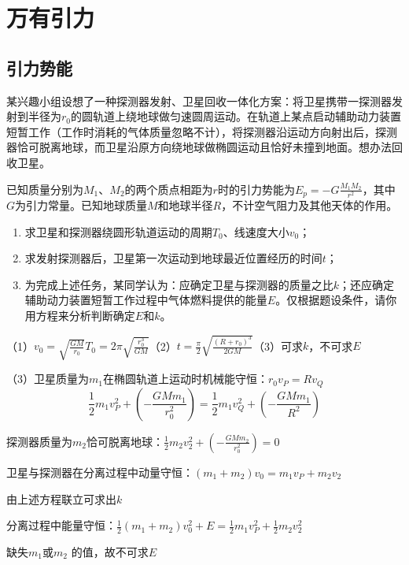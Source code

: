\section{万有引力}

\subsection{引力势能}

\begin{proset}
    某兴趣小组设想了一种探测器发射、卫星回收一体化方案：将卫星携带一探测器发射到半径为\(r_0\)的圆轨道上绕地球做匀速圆周运动。在轨道上某点启动辅助动力装置短暂工作（工作时消耗的气体质量忽略不计），将探测器沿运动方向射出后，探测器恰可脱离地球，而卫星沿原方向绕地球做椭圆运动且恰好未撞到地面。想办法回收卫星。

    \noindent 已知质量分别为\(M_1\)、\(M_2\)的两个质点相距为\(r\)时的引力势能为\(E_p = - G \frac{M_1M_2}{r^2}\)，其中\(G\)为引力常量。已知地球质量\(M\)和地球半径\(R\)，不计空气阻力及其他天体的作用。
    \begin{enumerate}[(1)]
        \item 求卫星和探测器绕圆形轨道运动的周期\(T_0\)、线速度大小\(v_0\)；
        \item 求发射探测器后，卫星第一次运动到地球最近位置经历的时间\(t\)；
        \item 为完成上述任务，某同学认为：应确定卫星与探测器的质量之比\(k\)；还应确定辅助动力装置短暂工作过程中气体燃料提供的能量\(E\)。仅根据题设条件，请你用方程来分析判断确定\(E\)和\(k\)。
    \end{enumerate}
\end{proset}
\begin{answer}
    （1）\(v_0 = \sqrt{\frac{GM}{r_0}}\)\quad \(T_0 = 2\pi \sqrt{\frac{r_0^3}{GM}}\)（2）\(t = \frac{\pi}{2} \sqrt{\frac{(R + r_0)^3}{2GM}}\)（3）可求\(k\)，不可求\(E\)


    （3）卫星质量为\(m_1\)在椭圆轨道上运动时机械能守恒：\(r_0 v_P = R v_Q\)
    \[
        \frac{1}{2}m_1 v_P^2 +( -  \frac{GMm_1}{r_0^2}) = \frac{1}{2}m_1 v_Q^2 +( - \frac{GMm_1}{R^2})
    \]

    探测器质量为\(m_2\)恰可脱离地球：\(\frac{1}{2}m_2 v_2^2 + (- \frac{GMm_2}{r_0^2}) = 0\)

    卫星与探测器在分离过程中动量守恒：\((m_1 + m_2)v_0 = m_1 v_P + m_2v_2\)

    由上述方程联立可求出\(k\)

    分离过程中能量守恒：\(\frac{1}{2}(m_1 + m_2)v_0^2 + E = \frac{1}{2}m_1 v_P^2 + \frac{1}{2}m_2 v_2^2\)

    缺失\(m_1\)或\(m_2\) 的值，故不可求\(E\)
\end{answer}